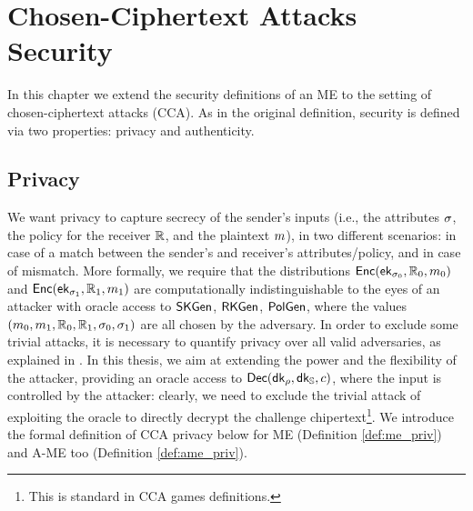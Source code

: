 \chapter{Chosen-Ciphertext Attacks Security}

In this chapter we extend the security definitions of an ME to the setting of chosen-ciphertext attacks (CCA).
As in the original definition, security is defined via two properties: privacy and authenticity.

\section{Privacy}\label{sec:cca-privacy}
We want privacy to capture secrecy of the sender's inputs (i.e., the attributes $\sigma$, the policy for the receiver $\mathbb{R}$, and the plaintext $m$), in two different scenarios: in case of a match between the sender's and receiver's attributes/policy, and in case of mismatch.
More formally, we require that the distributions $\mathsf{Enc}(\mathsf{ek}_{\sigma_0}, \mathbb{R}_0, m_0)$ and $\mathsf{Enc}(\mathsf{ek}_{\sigma_1}, \mathbb{R}_1, m_1)$ are computationally indistinguishable to the eyes of an attacker with oracle access to $\mathsf{SKGen}$, $\mathsf{RKGen}$, $\mathsf{PolGen}$, where the values $(m_0, m_1,\mathbb{R}_0, \mathbb{R}_1, \sigma_0, \sigma_1)$ are all chosen by the adversary.
In order to exclude some trivial attacks, it is necessary to quantify privacy over all valid adversaries, as explained in \cite{Ateniese}.
\newline\newline
In this thesis, we aim at extending the power and the flexibility of the attacker, providing an oracle access to $\mathsf{Dec}(\mathsf{dk}_\rho, \mathsf{dk}_{\mathbb{S}}, c)$, where the input is controlled by the attacker: clearly, we need to exclude the trivial attack of exploiting the oracle to directly decrypt the challenge chipertext\footnote{This is standard in CCA games definitions.}.
We introduce the formal definition of CCA privacy below for ME (Definition \ref{def:me_priv}) and A-ME too (Definition \ref{def:ame_priv}).





